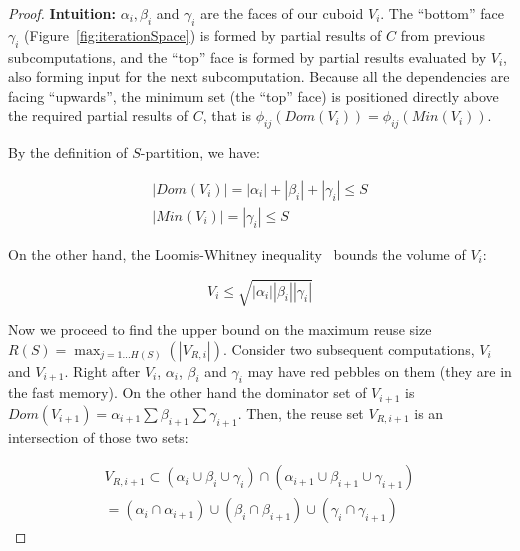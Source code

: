 \begin{proof}
	\textbf{Intuition:}  $\alpha_i, \beta_i$ and
	$\gamma_i$ are the faces of our cuboid $V_i$. The ``bottom'' face $\gamma_i$
	(Figure~\ref{fig:iterationSpace}) is formed by partial results of $C$ from
	previous subcomputations, and the ``top'' face is formed by partial results
	evaluated by $V_i$, also forming input for
	the next subcomputation. Because all the dependencies are facing 
	``upwards'', 
	the minimum set (the ``top'' face) is positioned directly above the 
	required 
	partial results of $C$, that is $\phi_{ij}(Dom(V_i)) = \phi_{ij}(Min(V_i))$.
	
	By the definition of $S$-partition, we have:
	
	\begin{gather}
	\label{eq:dm}
	|Dom(V_i)| = |\alpha_i| + |\beta_i| + |\gamma_i| \le S \\
	\nonumber
	|Min(V_i)| = |\gamma_i| \le S
	\end{gather}
	
	
	
	On the other hand, the Loomis-Whitney
	inequality~\cite{loomisWhitney} bounds the volume of $V_i$: 
	
	\begin{equation}
	\label{eq:lm}
	V_i \le \sqrt{|\alpha_i| |\beta_i| |\gamma_i|}
	\end{equation}
	
	
	
	Now we proceed to find the upper bound on the maximum reuse size $R(S) = 
	\max_{j = 1 \dots
		H(S)}(|V_{R,i}|)$. Consider two subsequent computations, $V_i$ and 
		$V_{i+1}$.
	Right after $V_i$, $\alpha_i$, $\beta_i$ and $\gamma_i$ may have red 
	pebbles on 
	them (they are in the fast memory). On the other hand the dominator set of 
	$V_{i+1}$ is $Dom(V_{i+1}) = \alpha_{i+1} \sum \beta_{i+1} \sum 
	\gamma_{i+1}$.
	Then, the reuse set $V_{R,i+1}$ is an intersection of those two sets:
	
	\begin{gather}
	\nonumber
	V_{R,i+1}
	\subset (\alpha_i \cup \beta_i \cup \gamma_i) \cap (\alpha_{i+1} 
	\cup 
	\beta_{i+1} \cup \gamma_{i+1}) \\
	\label{eq:vri1}
	= (\alpha_i \cap \alpha_{i+1}) \cup ( 
	\beta_i \cap 
	\beta_{i+1}) \cup (\gamma_i \cap \gamma_{i+1})
	\end{gather}
	

\end{proof}
